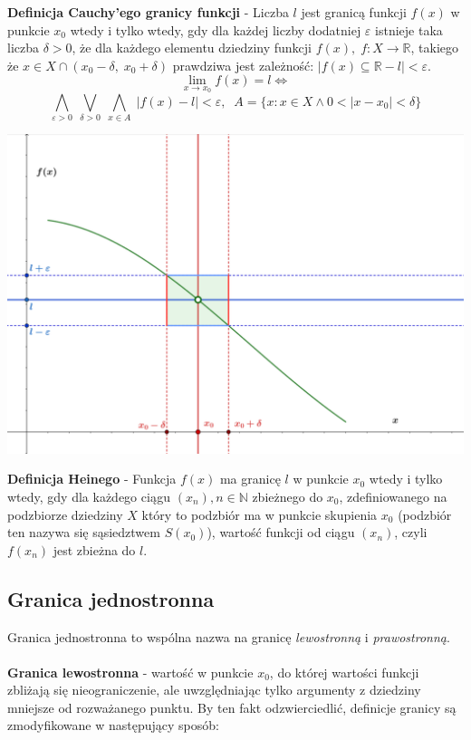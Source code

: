 \documentclass[14pt,a4paper]{extarticle}
\begin{document}
\noindent\textbf{Definicja Cauchy'ego granicy funkcji} - Liczba $l$ jest granicą funkcji $f(x)$ w punkcie $x_{0}$ wtedy i tylko wtedy, gdy dla
każdej liczby dodatniej $\varepsilon$ istnieje taka liczba $\delta > 0$, że dla każdego elementu dziedziny funkcji $f(x), \; f: X \rightarrow \mathbb{R}$, takiego że
$x \in X \cap (x_{0} - \delta,\; x_{0} + \delta)$ prawdziwa jest zależność: $\vert f(x) \subseteq \mathbb{R} - l\vert < \varepsilon$.\\
$$\lim_{x\to x_{0}} f(x) = l \Leftrightarrow $$
$$\underset{\varepsilon > 0}{\bigwedge} \;\underset{\delta > 0}{\bigvee} \; \underset{x \in A}{\bigwedge} \; \vert f(x) - l\vert < \varepsilon, \;\; A = \{x:x\in X \land 0 < \vert x - x_{0}\vert < \delta\}$$
\begin{center}
\includegraphics[scale=0.51]{limit funkcji.png}
\end{center}

\newpage
\noindent\textbf{Definicja Heinego} - Funkcja $f(x)$ ma granicę $l$ w punkcie $x_{0}$ wtedy i tylko wtedy,
gdy dla każdego ciągu $(x_{n}), n \in \mathbb{N}$ zbieżnego do $x_{0}$, zdefiniowanego na podzbiorze dziedziny $X$ który
to podzbiór ma w punkcie skupienia $x_{0}$ (podzbiór ten nazywa się sąsiedztwem $S(x_{0})$), wartość funkcji od ciągu $(x_{n})$, czyli $f(x_{n})$ jest zbieżna do $l$.

\subsection{Granica jednostronna}
\noindent Granica jednostronna to wspólna nazwa na granicę \textit{lewostronną} i \textit{prawostronną}.\\\\
\noindent\textbf{Granica lewostronna} - wartość w punkcie $x_{0}$, do której wartości funkcji zbliżają się nieograniczenie,
ale uwzględniając tylko argumenty z dziedziny mniejsze od rozważanego punktu. By ten fakt odzwierciedlić, definicje
granicy są zmodyfikowane w następujący sposób:\\
\end{document}
